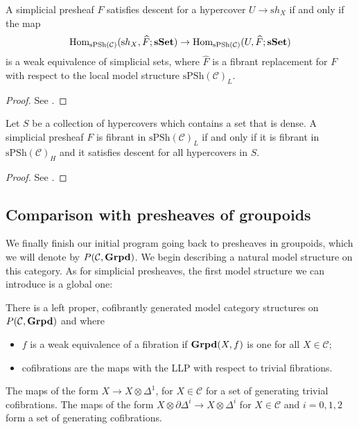 \begin{refsection}
\begin{lemma}
A simplicial presheaf $F$ satisfies descent for a hypercover $U \to \mathrm sh_X$ if and only if the map
\[
\mathrm{Hom}_{\mathrm{sPSh}(\mathcal C)}(\mathrm sh_X, \widehat{F};\mathbf{sSet}) \to \mathrm{Hom}_{\mathrm{sPSh}(\mathcal C)}(U, \widehat{F};\mathbf{sSet})
\]
is a weak equivalence of simplicial sets, where $\widehat{F}$ is a fibrant replacement for $F$ with respect to the local model structure $\mathrm{sPSh}(\mathcal C)_L$.
\end{lemma}

\begin{proof}
See \cite[Lemma 4.4]{hypercover}.
\end{proof}

\begin{thm}
Let $S$ be a collection of hypercovers which contains a set that is dense. A simplicial presheaf $F$ is fibrant in $\mathrm{sPSh}(\mathcal C)_L$ if and only if it is fibrant in $\mathrm{sPSh}(\mathcal C)_H$ and it satisfies descent for all hypercovers in $S$.
\end{thm}

\begin{proof}
See \cite[Cor. 7.1]{hypercover}.
\end{proof}

\subsection{Comparison with presheaves of groupoids}

We finally finish our initial program going back to presheaves in groupoids, which we will denote by $P(\mathcal C,\mathbf{Grpd})$. We begin describing a natural model structure on this category. As for simplicial presheaves, the first model structure we can introduce is a global one:

\begin{thm} \label{thm model structure on presheaves of groupoids}
There is a left proper, cofibrantly generated model category structures on $P(\mathcal C, \mathbf{Grpd})$ and where
\begin{itemize}
\item $f$ is a weak equivalence of a fibration if $\mathbf{Grpd}(X,f)$ is one for all $X \in \mathcal C$;
\item cofibrations are the maps with the LLP with respect to trivial fibrations.
\end{itemize}
The maps of the form $X \to X \otimes \Delta^1$, for $X \in \mathcal C$ for a set of generating trivial cofibrations. The maps of the form $X \otimes \partial \Delta^i \to X \otimes \Delta^i$ for $X \in \mathcal C$ and $i = 0,1,2$ form a set of generating cofibrations.
\end{thm}


\end{refsection}
